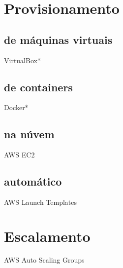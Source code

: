 \section{Provisionamento}

\subsection*{de máquinas virtuais}
VirtualBox*

\subsection*{de containers}
Docker*

\subsection*{na núvem}
AWS EC2

\subsection*{automático}
AWS Launch Templates

\section{Escalamento}
AWS Auto Scaling Groups






